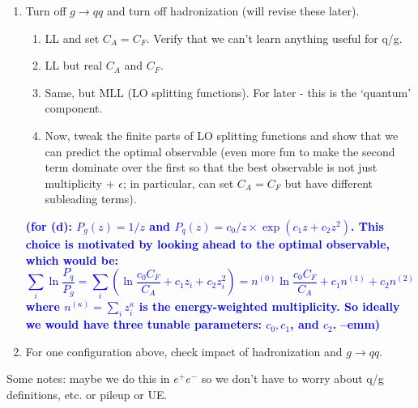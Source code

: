 \documentclass[letterpaper,11pt]{article}
\newcommand{\emm}[1]{\marginpar{\raggedright\scriptsize\textbf{\textcolor{blue}{emm}}}  \textbf{\textcolor{blue}{(#1 --emm)}}}
\begin{document}
\begin{enumerate}
\item Turn off $g\rightarrow qq$ and turn off hadronization (will revise these later).  
\begin{enumerate}
	\item LL and set $C_A=C_F$.  Verify that we can't learn anything useful for q/g.
	\item LL but real $C_A$ and $C_F$.
	\item Same, but MLL (LO splitting functions).  For later - this is the `quantum' component.
	\item Now, tweak the finite parts of LO splitting functions and show that we can predict the optimal observable (even more fun to make the second term dominate over the first so that the best observable is not just multiplicity + $\epsilon$; in particular, can set $C_A=C_F$ but have different subleading terms).
\end{enumerate}

\emm{for (d): $P_g(z) = 1/z$ and $P_q(z) = c_0/z \times \exp(c_1 z + c_2 z^2 )$. This choice is motivated by looking ahead to the optimal observable, which would be:
\begin{equation}
\sum_i \ln \frac{P_q}{P_g} = \sum_i\left(\ln \frac{c_0C_F}{C_A} + c_1 z_i + c_2 z^2_i\right) = n^{(0)}\ln \frac{c_0C_F}{C_A}  + c_1 n^{(1)} + c_2 n^{(2)} 
\end{equation}
where $n^{(\kappa)}=\sum_i z_i^\kappa$ is the energy-weighted multiplicity.  So ideally we would have three tunable parameters: $c_0, c_1$, and $c_2$.
}

\item For one configuration above, check impact of hadronization and $g\rightarrow qq$.
\end{enumerate}

Some notes: maybe we do this in $e^+e^-$ so we don't have to worry about q/g definitions, etc. or pileup or UE.
\end{document}
